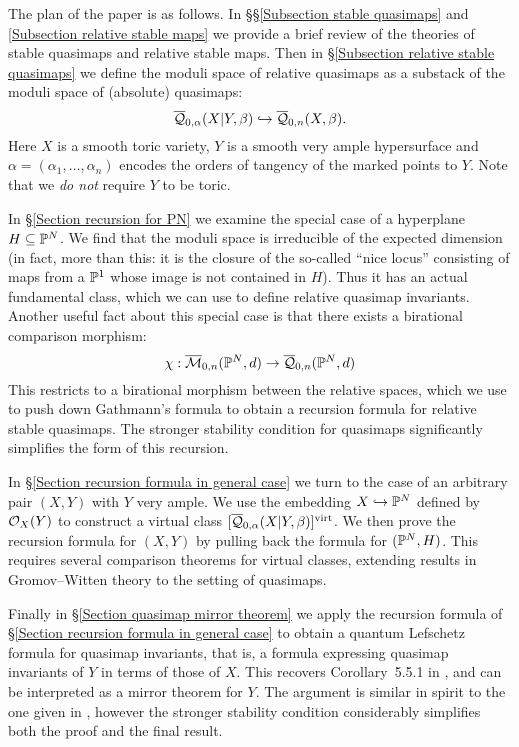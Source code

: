 The plan of the paper is as follows. In \S\S \ref{Subsection stable quasimaps} and \ref{Subsection relative stable maps} we provide a brief review of the theories of stable quasimaps and relative stable maps. Then in \S \ref{Subsection relative stable quasimaps} we define the moduli space of relative quasimaps as a substack of the moduli space of (absolute) quasimaps:
\begin{equation*} \overline{\mathcal Q}_{0,\alpha}(X|Y,\beta) \hookrightarrow \overline{\mathcal Q}_{0,n}(X,\beta). \end{equation*}
Here $X$ is a smooth toric variety, $Y$ is a smooth very ample hypersurface and $\alpha = (\alpha_1, \ldots, \alpha_n)$ encodes the orders of tangency of the marked points to $Y$. Note that we \emph{do not} require $Y$ to be toric.

In \S \ref{Section recursion for PN} we examine the special case of a hyperplane $H \subseteq \mathbb P^N$. We find that the moduli space is irreducible of the expected dimension (in fact, more than this: it is the closure of the so-called ``nice locus'' consisting of maps from a $\mathbb P^1$ whose image is not contained in $H$). Thus it has an actual fundamental class, which we can use to define relative quasimap invariants.
Another useful fact about this special case is that there exists a birational comparison morphism:
\begin{equation*} \chi : \overline{\mathcal M}_{0,n}(\mathbb P^N,d) \rightarrow \overline{\mathcal Q}_{0,n}(\mathbb P^N,d) \end{equation*} 
This restricts to a birational morphism between the relative spaces, which we use to push down Gathmann's formula to obtain a recursion formula for relative stable quasimaps. The stronger stability condition for quasimaps significantly simplifies the form of this recursion.

In \S \ref{Section recursion formula in general case} we turn to the case of an arbitrary pair $(X,Y)$ with $Y$ very ample. We use the embedding $X \hookrightarrow \mathbb P^N$ defined by $\mathcal{O}_X(Y)$ to construct a virtual class $[\overline{\mathcal Q}_{0,\alpha}(X|Y,\beta)]^{\operatorname{virt}}$.
We then prove the recursion formula for $(X,Y)$ by pulling back the formula for $(\mathbb P^N,H)$. This requires several comparison theorems for virtual classes, extending results in Gromov--Witten theory to the setting of quasimaps.

Finally in \S \ref{Section quasimap mirror theorem} we apply the recursion formula of \S \ref{Section recursion formula in general case} to obtain a quantum Lefschetz formula for quasimap invariants, that is, a formula expressing quasimap invariants of $Y$ in terms of those of $X$. This recovers Corollary~5.5.1 in \cite{CF-K-wallcrossing}, and can be interpreted as a mirror theorem for $Y$. The argument is similar in spirit to the one given in \cite{Ga-MF}, however the stronger stability condition considerably simplifies both the proof and the final result.

